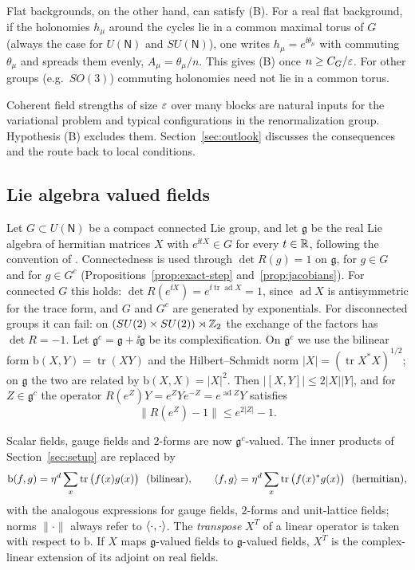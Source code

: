 Flat backgrounds, on the other hand, can satisfy (B). For a real flat background, if the holonomies $h_\mu$ around the cycles lie in a common maximal torus of $G$ (always the case for $U(\mathsf N)$ and $SU(\mathsf N)$), one writes $h_\mu=e^{\ii\theta_\mu}$ with commuting $\theta_\mu$ and spreads them evenly, $A_\mu=\theta_\mu/n$. This gives (B) once $n\ge C_G/\varepsilon$. For other groups (e.g.\ $SO(3)$) commuting holonomies need not lie in a common torus.

Coherent field strengths of size $\varepsilon$ over many blocks are natural inputs for the variational problem and typical configurations in the renormalization group. Hypothesis (B) excludes them. Section~\ref{sec:outlook} discusses the consequences and the route back to local conditions.

\subsection{Lie algebra valued fields}

Let $G\subset U(\mathsf N)$ be a compact connected Lie group, and let $\mathfrak g$ be the real Lie algebra of hermitian matrices $X$ with $e^{\ii tX}\in G$ for every $t\in\mathbb R$, following the convention of \cite{BalPropI,BalBackground}. Connectedness is used through $\det R(g)=1$ on $\mathfrak g$, for $g\in G$ and for $g\in G^c$ (Propositions~\ref{prop:exact-step} and~\ref{prop:jacobians}). For connected $G$ this holds: $\det R(e^{\ii X})=e^{\ii\operatorname{tr}\operatorname{ad}X}=1$, since $\operatorname{ad}X$ is antisymmetric for the trace form, and $G$ and $G^c$ are generated by exponentials. For disconnected groups it can fail: on $(SU(2)\times SU(2))\rtimes\mathbb Z_2$ the exchange of the factors has $\det R=-1$. Let $\mathfrak g^c=\mathfrak g+\ii\mathfrak g$ be its complexification. On $\mathfrak g^c$ we use the bilinear form $\mathrm b(X,Y)=\operatorname{tr}(XY)$ and the Hilbert--Schmidt norm $|X|=(\operatorname{tr}X^*X)^{1/2}$; on $\mathfrak g$ the two are related by $\mathrm b(X,X)=|X|^2$. Then $|[X,Y]|\le2|X||Y|$, and for $Z\in\mathfrak g^c$ the operator $R(e^{Z})Y=e^ZYe^{-Z}=e^{\operatorname{ad}Z}Y$ satisfies
\begin{equation}\label{eq:Ad-bound}
\|R(e^{Z})-1\|\le e^{2|Z|}-1 .
\end{equation}

Scalar fields, gauge fields and $2$-forms are now $\mathfrak g^c$-valued. The inner products of Section~\ref{sec:setup} are replaced by
\[
\mathrm b(f,g)=\eta^d\sum_x\operatorname{tr}\big(f(x)g(x)\big)\ \ \text{(bilinear)},\qquad \ip fg=\eta^d\sum_x\operatorname{tr}\big(f(x)^*g(x)\big)\ \ \text{(hermitian)},
\]
with the analogous expressions for gauge fields, $2$-forms and unit-lattice fields; norms $\|\cdot\|$ always refer to $\langle \cdot,\cdot\rangle$. The \emph{transpose} $X^T$ of a linear operator is taken with respect to $\mathrm b$. If $X$ maps $\mathfrak g$-valued fields to $\mathfrak g$-valued fields, $X^T$ is the complex-linear extension of its adjoint on real fields.


